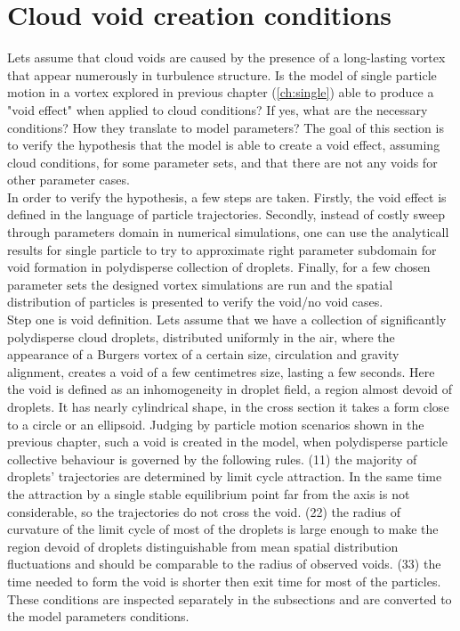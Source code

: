 \documentclass[../main.tex]{subfiles}
\begin{document}
\section{Cloud void creation conditions}
\label{ch4s2}
Lets assume that cloud voids are caused by the presence of a long-lasting vortex that appear numerously in turbulence structure. Is the model of single particle motion in a vortex explored in previous chapter (\autoref{ch:single}) able to produce a "void effect" when applied to cloud conditions? If yes, what are the necessary conditions? How they translate to model parameters? The goal of this section is to verify the hypothesis that the model is able to create a void effect, assuming cloud conditions, for some parameter sets, and that there are not any voids for other parameter cases.\\
In order to verify the hypothesis, a few steps are taken. Firstly, the void effect is defined in the language of particle trajectories. Secondly, instead of costly sweep through parameters domain in numerical simulations, one can use the analyticall results for single particle to try to approximate right parameter subdomain for void formation in polydisperse collection of droplets. Finally, for a few chosen parameter sets the designed vortex simulations are run and the spatial distribution of particles is presented to verify the void/no void cases.\\
Step one is void definition. Lets assume that we have a collection of significantly polydisperse cloud droplets, distributed uniformly in the air, where the appearance of a Burgers vortex of a certain size, circulation and gravity alignment, creates a void of a few centimetres size, lasting a few seconds. Here the void is defined as an inhomogeneity in droplet field, a region almost devoid of droplets. It has nearly cylindrical shape, in the cross section it takes a form close to a circle or an ellipsoid.
Judging by particle motion scenarios shown in the previous chapter, such a void is created in the model, when polydisperse particle collective behaviour is governed by the following rules. 
(11) the majority of droplets' trajectories are determined by limit cycle attraction. In the same time the attraction by a single stable equilibrium point far from the axis is not considerable, so the trajectories do not cross the void.
(22) the radius of curvature of the limit cycle of most of the droplets is large enough to make the region devoid of droplets distinguishable from mean spatial distribution fluctuations and should be comparable to the radius  of observed voids. 
(33) the time needed to form the void is shorter then exit time for most of the particles.
These conditions are inspected separately in the subsections and are converted to the model parameters conditions.
\end{document}
